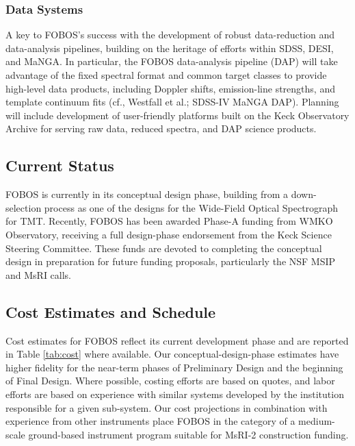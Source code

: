 \subsubsection{Data Systems} A key to FOBOS's success with the
development of robust data-reduction and data-analysis pipelines,
building on the heritage of efforts within SDSS, DESI, and MaNGA. In
particular, the FOBOS data-analysis pipeline (DAP) will take
advantage of the fixed spectral format and common target classes to
provide high-level data products, including Doppler shifts,
emission-line strengths, and template continuum fits (cf., Westfall
et al.; SDSS-IV MaNGA DAP). Planning will include development of
user-friendly platforms built on the Keck Observatory Archive for
serving raw data, reduced spectra, and DAP science products.


\subsection{Current Status} FOBOS is currently in its conceptual design
phase, building from a down-selection process as one of the designs for
the Wide-Field Optical Spectrograph for TMT. Recently, FOBOS has been
awarded Phase-A funding from WMKO Observatory, receiving a full
design-phase endorsement from the Keck Science Steering Committee. These
funds are devoted to completing the conceptual design in preparation for
future funding proposals, particularly the NSF MSIP and MsRI calls.

\subsection{Cost Estimates and Schedule}

Cost estimates for FOBOS reflect its current development phase and are reported in Table \ref{tab:cost} where
available.  Our conceptual-design-phase estimates have higher fidelity for the near-term phases of Preliminary Design
and the beginning of Final Design.  Where possible, costing efforts are based on quotes, and labor efforts are based on
experience with similar systems developed by the institution responsible for a given sub-system.  Our cost projections
in combination with experience from other instruments place FOBOS in the category of a medium-scale ground-based
instrument program suitable for MsRI-2 construction funding. %

